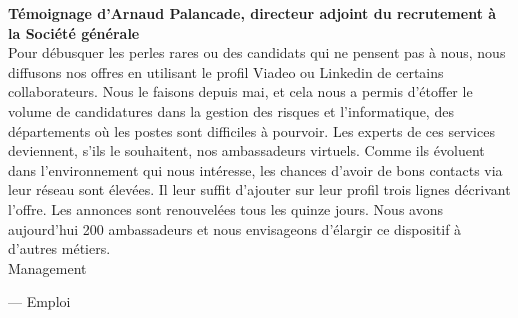 \documentclass[11pt,twoside,a4paper]{article}
\begin{document}
\textbf{T{\'e}moignage d'Arnaud Palancade, directeur adjoint du recrutement {\`a} la Soci{\'e}t{\'e} g{\'e}n{\'e}rale}~\\

Pour d{\'e}busquer les perles rares ou des candidats qui ne pensent pas {\`a} nous, nous diffusons nos offres en utilisant le profil Viadeo ou Linkedin de certains collaborateurs. Nous le faisons depuis mai, et cela nous a permis d'{\'e}toffer le volume de candidatures dans la gestion des risques et l'informatique, des d{\'e}partements o{\`u} les postes sont difficiles {\`a} pourvoir. Les experts de ces services deviennent, s'ils le souhaitent, nos ambassadeurs virtuels. Comme ils {\'e}voluent dans l'environnement qui nous int{\'e}resse, les chances d'avoir de bons contacts via leur r{\'e}seau sont {\'e}lev{\'e}es. Il leur suffit d'ajouter sur leur profil trois lignes d{\'e}crivant l'offre. Les annonces sont renouvel{\'e}es tous les quinze jours. Nous avons aujourd'hui 200 ambassadeurs et nous envisageons d'{\'e}largir ce dispositif {\`a} d'autres m{\'e}tiers. ~\\

\textcopyright Management

--- Emploi
\end{document}
